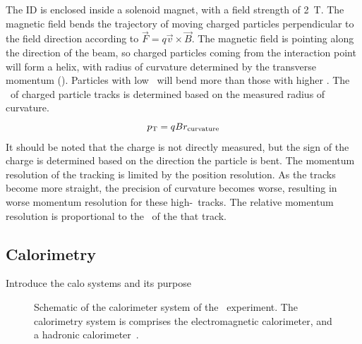 The ID is enclosed inside a solenoid magnet, with a field strength of 2~T.
The magnetic field bends the trajectory of moving charged particles
perpendicular to the field direction according to
$\vec{F} = q \vec{v}\times \vec{B}$.
The magnetic field is pointing along the direction of the beam, so charged
particles coming from the interaction point will form a helix, with radius
of curvature determined by the transverse momentum (\pt).
Particles with low \pt\ will bend more than those with higher \pt.
The \pt\ of charged particle tracks is determined based on the measured radius
of curvature.
\begin{equation}
  p_{\mathrm{T}} = qBr_\mathrm{curvature}
\end{equation}
It should be noted that the charge is not directly measured, but the sign of
the charge is determined based on the direction the particle is bent.
The momentum resolution of the tracking is limited by the position resolution.
As the tracks become more straight, the precision of curvature becomes worse,
resulting in worse momentum resolution for these high-\pt\ tracks.
The relative momentum resolution is proportional to the \pt\ of the that track.

\FloatBarrier
\subsection{Calorimetry} 
\label{sec:calo}

{\color{red} Introduce the calo systems and its purpose}

\begin{figure}[ht]
  \caption[
    Schematic of the calorimeter system of the
    \atlas\ experiment~\cite{cern-jinst-atlas}.
  ]{
    Schematic of the calorimeter system of the
    \atlas\ experiment.
    The calorimetry system is comprises the electromagnetic calorimeter,
    and a hadronic calorimeter~\cite{cern-jinst-atlas}.
  }
  \label{fig:calo_cartoon}
\end{figure}


